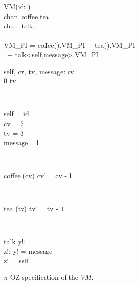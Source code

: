 \begin{figure}[H]
\centering
\begin{class}{VM(id: \integer)}
\ 
\\chan\ coffee,tea
\ 
\\chan\ talk:\integer \times \integer
\ \\ \
\\VM\_PI = coffee().VM\_PI + tea().VM\_PI 
\\ \ \qquad \qquad + talk<self,message>.VM\_PI
\\
\begin{state}
self, cv, tv, message: \integer
{} \leq  cv 
\\
0 \leq  tv 
\end{state} 
\\
\begin{init}
self = id
\\cv = 3
\\tv = 3
\\ message= 1
\end{init} 
\\
\begin{op}{coffee}
\Delta (cv)
\ST
cv' = cv - 1
\end{op}
\\
\begin{op}{tea}
\Delta (tv)
\ST
tv' = tv - 1
\end{op}
\\
\begin{op}{talk}
y!: \integer
\\z!: \integer
\ST
y! = message
\\z! = self
\end{op}
\end{class}
\caption{$\pi$-OZ specification of the $VM$.}
\label{comp_oz_pi_statefull_vm}
\end{figure}